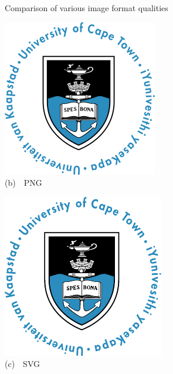 \begin{FigureEnvironment}{Comparison of various image format qualities}
\begin{minipage}[b]{0.3\textwidth}
    \includegraphics[width=\textwidth]{Figures/UCT.png}\\%
    {\small (b)~~PNG}%
  \end{minipage}
  \hfill
  \begin{minipage}[b]{0.3\textwidth}\centering\setlength{\parindent}{0mm}
    \includegraphics[width=\textwidth]{Figures/UCT_Circular.pdf}\\%
    {\small (c)~~SVG}%
  \end{minipage}
  \hfill\mbox{}\\[1mm]
\end{FigureEnvironment}%


